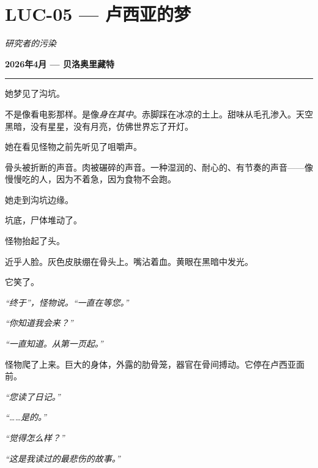 \section*{\textbf{LUC-05} --- 卢西亚的梦}

\noindent \textit{研究者的污染}

\noindent \textbf{2026年4月 --- 贝洛奥里藏特}

\vspace{0.5em}\noindent\rule{\textwidth}{0.5pt}\vspace{0.5em}

\noindent 她梦见了沟坑。

\noindent 不是像看电影那样。是像\textit{身在其中}。赤脚踩在冰凉的土上。甜味从毛孔渗入。天空黑暗，没有星星，没有月亮，仿佛世界忘了开灯。

\noindent 她在看见怪物之前先听见了咀嚼声。

\noindent 骨头被折断的声音。肉被碾碎的声音。一种湿润的、耐心的、有节奏的声音——像慢慢吃的人，因为不着急，因为食物不会跑。

\noindent 她走到沟坑边缘。

\noindent 坑底，尸体堆动了。

\noindent 怪物抬起了头。

\noindent 近乎人脸。灰色皮肤绷在骨头上。嘴沾着血。黄眼在黑暗中发光。

\noindent 它笑了。

\noindent \textit{\textquotedblleft{}终于\textquotedblright{}，怪物说。\textquotedblleft{}一直在等您。\textquotedblright{}}

\noindent \textit{\textquotedblleft{}你知道我会来？\textquotedblright{}}

\noindent \textit{\textquotedblleft{}一直知道。从第一页起。\textquotedblright{}}

\noindent 怪物爬了上来。巨大的身体，外露的肋骨笼，器官在骨间搏动。它停在卢西亚面前。

\noindent \textit{\textquotedblleft{}您读了日记。\textquotedblright{}}

\noindent \textit{\textquotedblleft{}……是的。\textquotedblright{}}

\noindent \textit{\textquotedblleft{}觉得怎么样？\textquotedblright{}}

\noindent \textit{\textquotedblleft{}这是我读过的最悲伤的故事。\textquotedblright{}}

